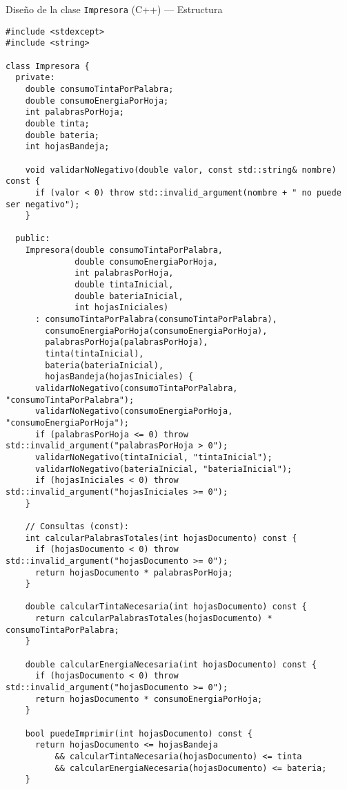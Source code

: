 \documentclass[aspectratio=169]{beamer}
\begin{document}
\begin{frame}[fragile]{Diseño de la clase \texttt{Impresora} (C++) — Estructura}
\lstset{style=cppstyle}
\begin{lstlisting}
#include <stdexcept>
#include <string>

class Impresora {
  private:
    double consumoTintaPorPalabra;
    double consumoEnergiaPorHoja;
    int palabrasPorHoja;
    double tinta;
    double bateria;
    int hojasBandeja;

    void validarNoNegativo(double valor, const std::string& nombre) const {
      if (valor < 0) throw std::invalid_argument(nombre + " no puede ser negativo");
    }

  public:
    Impresora(double consumoTintaPorPalabra,
              double consumoEnergiaPorHoja,
              int palabrasPorHoja,
              double tintaInicial,
              double bateriaInicial,
              int hojasIniciales)
      : consumoTintaPorPalabra(consumoTintaPorPalabra),
        consumoEnergiaPorHoja(consumoEnergiaPorHoja),
        palabrasPorHoja(palabrasPorHoja),
        tinta(tintaInicial),
        bateria(bateriaInicial),
        hojasBandeja(hojasIniciales) {
      validarNoNegativo(consumoTintaPorPalabra, "consumoTintaPorPalabra");
      validarNoNegativo(consumoEnergiaPorHoja, "consumoEnergiaPorHoja");
      if (palabrasPorHoja <= 0) throw std::invalid_argument("palabrasPorHoja > 0");
      validarNoNegativo(tintaInicial, "tintaInicial");
      validarNoNegativo(bateriaInicial, "bateriaInicial");
      if (hojasIniciales < 0) throw std::invalid_argument("hojasIniciales >= 0");
    }

    // Consultas (const):
    int calcularPalabrasTotales(int hojasDocumento) const {
      if (hojasDocumento < 0) throw std::invalid_argument("hojasDocumento >= 0");
      return hojasDocumento * palabrasPorHoja;
    }

    double calcularTintaNecesaria(int hojasDocumento) const {
      return calcularPalabrasTotales(hojasDocumento) * consumoTintaPorPalabra;
    }

    double calcularEnergiaNecesaria(int hojasDocumento) const {
      if (hojasDocumento < 0) throw std::invalid_argument("hojasDocumento >= 0");
      return hojasDocumento * consumoEnergiaPorHoja;
    }

    bool puedeImprimir(int hojasDocumento) const {
      return hojasDocumento <= hojasBandeja
          && calcularTintaNecesaria(hojasDocumento) <= tinta
          && calcularEnergiaNecesaria(hojasDocumento) <= bateria;
    }


\end{lstlisting}
\end{frame}
\end{document}
